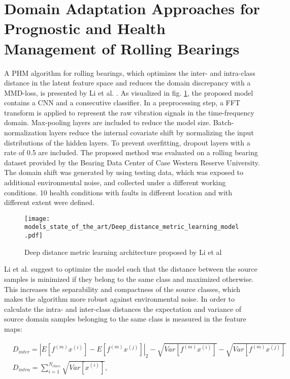 \section{Domain Adaptation Approaches for Prognostic and Health Management of Rolling Bearings}

A PHM algorithm for rolling bearings, which optimizes the inter- and intra-class distance in the latent feature space and reduces the domain discrepancy with a MMD-loss, is presented by Li et al. \cite{Li2018}. As visualized in fig. \ref{fig:Deep_distance_metric_learning_model}, the proposed model contains a CNN and a consecutive classifier. In a preprocessing step, a FFT transform is applied to represent the raw vibration signals in the time-frequency domain. Max-pooling layers are included to reduce the model size. Batch-normalization layers reduce the internal covariate shift by normalizing the input distributions of the hidden layers. To prevent overfitting, dropout layers with a rate of 0.5 are included. The proposed method was evaluated on a rolling bearing dataset provided by the Bearing Data Center of Case Western Reserve University. The domain shift was generated by using testing data, which was exposed to additional environmental noise, and collected under a different working conditions. 10 health conditions with faults in different location and with different extent were defined. 

\begin{figure}[H]
  \centering
  \texttt{[image: models\_state\_of\_the\_art/Deep\_distance\_metric\_learning\_model.pdf]}
  \caption{Deep distance metric learning architecture proposed by Li et al \cite{Li2018}}
  \label{fig:Deep_distance_metric_learning_model}
\end{figure}

Li et al. \cite{Li2018} suggest to optimize the model such that the distance between the source samples is minimized if they belong to the same class and maximized otherwise. This increases the separability and compactness of the source classes, which makes the algorithm more robust against environmental noise. In order to calculate the intra- and inter-class distances the expectation and variance of source domain samples belonging to the same class is measured in the feature maps:

\begin{equation}
    \begin{aligned}
       &D_{inter} = |E[f^{(m)}x^{(i)}]-E[f^{(m)}x^{(j)}]|_{2}-\sqrt{Var[f^{(m)}x^{(i)}]}-\sqrt{Var[f^{(m)}x^{(j)}]}\\
       &D_{intra} = 
        \sum_{i=1}^{N_{class}} \sqrt{Var[x^{(i)}]},
    \end{aligned}
\end{equation}

